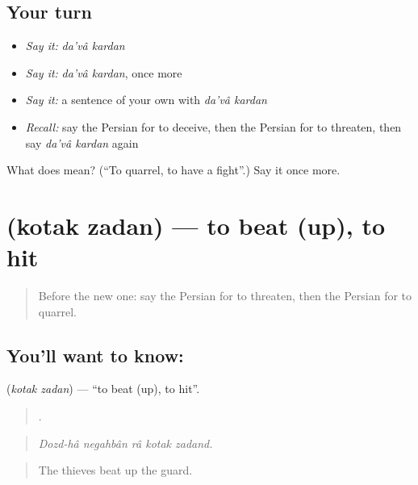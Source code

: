 \subsection*{Your turn}
\begin{itemize}
\raggedright
  \item \emph{Say it:} \emph{da'vâ kardan}
  \item \emph{Say it:} \emph{da'vâ kardan}, once more
  \item \emph{Say it:} a sentence of your own with \emph{da'vâ kardan}
  \item \emph{Recall:} say the Persian for to deceive, then the Persian for to threaten, then say \emph{da'vâ kardan} again
\end{itemize}

\begin{tcolorbox}[breakable,colback=teal!4,colframe=teal!35!black,title={Before you move on}]
What does   mean? (\textquotedblleft{}To quarrel, to have a fight\textquotedblright{}.) Say it once more.
\end{tcolorbox}
\section[\texorpdfstring{\fa{کتک} \fa{زدن} (kotak zadan)}{کتک زدن (kotak zadan)}]{  (kotak zadan) — to beat (up), to hit}

\label{lesson:FA-C323-kotak-zadan}



\begin{quote}
Before the new one: say the Persian for to threaten, then the Persian for to quarrel.
\end{quote}

\subsection*{You'll want to know:  }
\textbf{ } (\emph{kotak zadan}) — \textquotedblleft{}to beat (up), to hit\textquotedblright{}.

\begin{quote}
    .
\end{quote}

\begin{quote}
\emph{Dozd-hâ negahbân râ kotak zadand.}
\end{quote}

\begin{quote}
The thieves beat up the guard.
\end{quote}

